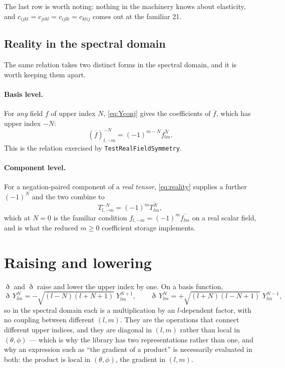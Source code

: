 \documentclass[11pt,a4paper]{article}
\newcommand{\conj}[1]{\overline{#1}}
\newcommand{\code}[1]{\texttt{#1}}
\begin{document}
The last row is worth noting: nothing in the machinery knows about
elasticity, and $c_{ijkl}=c_{jikl}=c_{ijlk}=c_{klij}$ comes out at the
familiar 21.

\subsection{Reality in the spectral domain}
\label{sec:spectralreality}

The same relation takes two distinct forms in the spectral domain, and it
is worth keeping them apart.

\paragraph{Basis level.}  For \emph{any} field $f$ of upper index $N$,
\eqref{eq:Yconj} gives the coefficients of $\conj{f}$, which has upper
index $-N$:
\begin{equation}
  \left(\conj{f}\right)^{-N}_{l,-m} = (-1)^{m-N}\conj{f^{N}_{lm}}.
  \label{eq:basiclevel}
\end{equation}
This is the relation exercised by \code{TestRealFieldSymmetry}.

\paragraph{Component level.}  For a negation-paired component of a
\emph{real tensor}, \eqref{eq:reality} supplies a further $(-1)^N$ and the
two combine to
\begin{equation}
  T^{-N}_{l,-m} = (-1)^{m}\conj{T^{N}_{lm}},
  \label{eq:complevel}
\end{equation}
which at $N=0$ is the familiar condition $f_{l,-m}=(-1)^m\conj{f_{lm}}$ on
a real scalar field, and is what the reduced $m\geq 0$ coefficient
storage implements.

\section{Raising and lowering}
\label{sec:eth}

$\eth$ and $\conj{\eth}$ raise and lower the upper index by one.  On a
basis function,
\begin{equation}
  \eth\, Y^{N}_{lm} = -\sqrt{(l-N)(l+N+1)}\; Y^{N+1}_{lm},
  \qquad
  \conj{\eth}\, Y^{N}_{lm} = +\sqrt{(l+N)(l-N+1)}\; Y^{N-1}_{lm},
  \label{eq:eth}
\end{equation}
so in the spectral domain each is a multiplication by an $l$-dependent
factor, with no coupling between different $(l,m)$.  They are the
operations that connect different upper indices, and they are diagonal in
$(l,m)$ rather than local in $(\theta,\phi)$ --- which is why the library
has two representations rather than one, and why an expression such as
``the gradient of a product'' is necessarily evaluated in both: the
product is local in $(\theta,\phi)$, the gradient in $(l,m)$.
\end{document}
